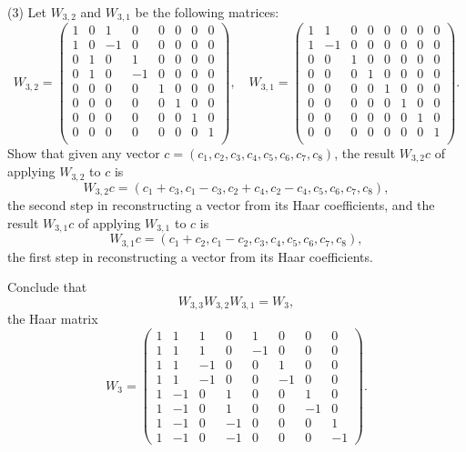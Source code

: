 \documentclass[12pt]{article}
\begin{document}
\medskip
(3)
Let $W_{3, 2}$ and $W_{3, 1}$ be the following matrices:
\[
W_{3, 2} =
\begin{pmatrix}
1  &  0  & 1    &  0   & 0    & 0  &  0  &  0  \\
1  &  0  &  -1 &  0   & 0    & 0  &  0  &  0 \\
0   &  1  &  0  &  1   & 0    & 0  &  0  &  0 \\
0   &  1  &  0  &  -1 & 0    & 0  &  0  &  0 \\
0   &  0  &  0 & 0 &  1  &  0  & 0    & 0  \\
0   &  0  &  0 & 0 &  0  &  1  &  0   & 0  \\
0   &  0  &  0 & 0 &  0  &  0  &  1   & 0  \\
0   &  0  &  0 & 0 &  0  &  0  & 0    & 1  \\
\end{pmatrix},
\quad
W_{3, 1} =
\begin{pmatrix}
1  &  1   & 0    &  0   & 0    & 0  &  0  &  0  \\
1  & -1  &  0   &  0   & 0    & 0  &  0  &  0 \\
0   &  0  &  1   &   0   & 0    & 0  &  0  &  0 \\
0   &  0   &  0  &   1 & 0    & 0  &  0  &  0 \\
0   &  0  &  0 & 0 &  1  &  0  & 0    & 0  \\
0   &  0  &  0 & 0 &  0  &  1  &  0   & 0  \\
0   &  0  &  0 & 0 &  0  &  0  &  1   & 0  \\
0   &  0  &  0 & 0 &  0  &  0  & 0    & 1  \\
\end{pmatrix}.
\]
Show that given any vector $c = (c_1, c_2, c_3, c_4, c_5, 
c_6,c_7, c_8)$, the result $W_{3, 2} c$ of applying $W_{3,2}$ to $c$ is 
\[
W_{3, 2} c =
(c_1 + c_3, c_1- c_3, c_2 + c_4, c_2 - c_4, c_5, c_6, c_7, c_8),
\]
the second step in reconstructing a vector  from its Haar coefficients, 
and the result $W_{3, 1} c$ of applying $W_{3, 1}$ to $c$ is 
\[
W_{3, 1} c =
(c_1 + c_2, c_1- c_2, c_3,  c_4, c_5, c_6, c_7, c_8),
\]
the first step in reconstructing a vector  from its Haar coefficients. 

\medskip
Conclude that
\[
W_{3, 3} W_{3, 2}W_{3, 1} = W_3,
\]
the Haar matrix 
\[
W_3 = 
\begin{pmatrix}
1  &  1   &  1  &  0   &  1  &  0  &  0  &  0  \\  
1  &  1   &  1  &  0   & -1 &  0  &  0  &  0 \\
1  &  1   & -1 &  0   &  0  &  1  &  0  &  0 \\
1  &  1   & -1 &  0   &  0  & -1 &  0  &  0 \\
1  & -1  &  0  &  1   &  0  &  0  &  1  &  0 \\
1  & -1  &  0  &  1   &  0  &  0  & -1 &  0 \\
1  & -1  &  0  & -1  &  0  &  0  &  0  &  1 \\
1  & -1  &  0  & -1  &  0  &  0  &  0  & -1
\end{pmatrix}.
\]
\end{document}
